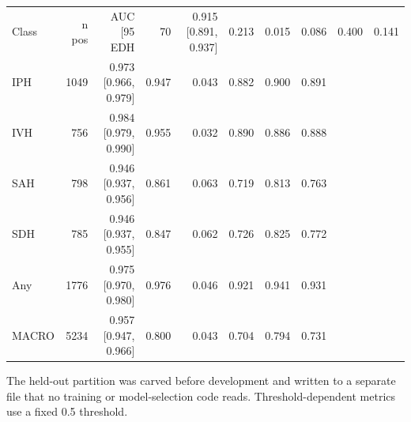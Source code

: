 \begin{tabular}{lrrrrrrr}
\toprule
Class & n pos & AUC [95%
\midrule
EDH & 70 & 0.915 [0.891, 0.937] & 0.213 & 0.015 & 0.086 & 0.400 & 0.141 \\
IPH & 1049 & 0.973 [0.966, 0.979] & 0.947 & 0.043 & 0.882 & 0.900 & 0.891 \\
IVH & 756 & 0.984 [0.979, 0.990] & 0.955 & 0.032 & 0.890 & 0.886 & 0.888 \\
SAH & 798 & 0.946 [0.937, 0.956] & 0.861 & 0.063 & 0.719 & 0.813 & 0.763 \\
SDH & 785 & 0.946 [0.937, 0.955] & 0.847 & 0.062 & 0.726 & 0.825 & 0.772 \\
Any & 1776 & 0.975 [0.970, 0.980] & 0.976 & 0.046 & 0.921 & 0.941 & 0.931 \\
MACRO & 5234 & 0.957 [0.947, 0.966] & 0.800 & 0.043 & 0.704 & 0.794 & 0.731 \\
\bottomrule
\end{tabular}

\vspace{2pt}
{\footnotesize The held-out partition was carved before development and written to a separate file that no training or model-selection code reads. Threshold-dependent metrics use a fixed 0.5 threshold.}
